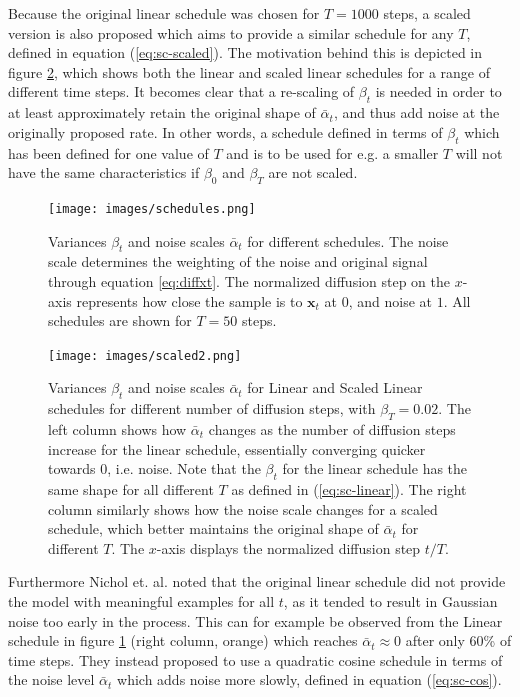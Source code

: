 \documentclass{report}
\begin{document}
Because the original linear schedule was chosen for $T=1000$ steps, a scaled version is also proposed which aims to provide a similar schedule for any $T$, defined in equation (\ref{eq:sc-scaled}). The motivation behind this is depicted in figure \ref{fig:scaled}, which shows both the linear and scaled linear schedules for a range of different time steps. It becomes clear that a re-scaling of $\beta_t$ is needed in order to at least approximately retain the original shape of $\bar{\alpha}_t$, and thus add noise at the originally proposed rate. In other words, a schedule defined in terms of $\beta_t$ which has been defined for one value of $T$ and is to be used for e.g. a smaller $T$ will not have the same characteristics if $\beta_0$ and $\beta_T$ are not scaled.
\begin{figure}[H]
    \centering
    \texttt{[image: images/schedules.png]}
    \caption{\onehalfspacing Variances $\beta_t$ and noise scales $\bar{\alpha}_t$ for different schedules. The noise scale determines the weighting of the noise and original signal through equation \ref{eq:diffxt}. The normalized diffusion step on the $x$-axis represents how close the sample is to $\bm{x}_t$ at $0$, and noise at $1$. All schedules are shown for $T=50$ steps.}
    \label{fig:schedules}
\end{figure}
\begin{figure}[H]
    \centering
    \texttt{[image: images/scaled2.png]}
    \caption{\onehalfspacing Variances $\beta_t$ and noise scales $\bar{\alpha}_t$ for Linear and Scaled Linear schedules for different number of diffusion steps, with $\beta_T=0.02$. The left column shows how $\bar{\alpha}_t$ changes as the number of diffusion steps increase for the linear schedule, essentially converging quicker towards 0, i.e. noise. Note that the $\beta_t$ for the linear schedule has the same shape for all different $T$ as defined in (\ref{eq:sc-linear}). The right column similarly shows how the noise scale changes for a scaled schedule, which better maintains the original shape of $\bar{\alpha}_t$ for different $T$. The $x$-axis displays the normalized diffusion step $t/T$.}
    \label{fig:scaled}
\end{figure}
Furthermore Nichol et. al. \cite{nichol2021improved} noted that the original linear schedule did not provide the model with meaningful examples for all $t$, as it tended to result in Gaussian noise too early in the process. This can for example be observed from the Linear schedule in figure \ref{fig:schedules} (right column, orange) which reaches $\bar{\alpha}_t \approx 0$ after only 60\% of time steps. They instead proposed to use a quadratic cosine schedule in terms of the noise level $\bar{\alpha}_t$ which adds noise more slowly, defined in equation (\ref{eq:sc-cos}).
\end{document}
